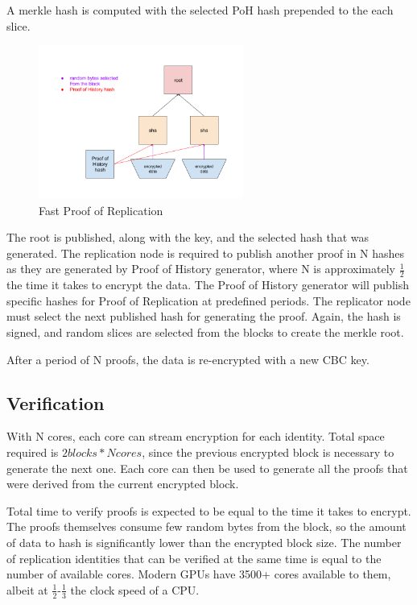 \documentclass[12pt]{article}
\begin{document}
A merkle hash is computed with the selected PoH hash prepended to the each slice.

\begin{figure}
  \begin{center}
    \centering
    \includegraphics[width=0.6\textwidth]{figures/fig_8.png}
    \caption[Fig 8]{Fast Proof of Replication\label{fig_8}}
  \end{center}
  \end{figure}

The root is published, along with the key, and the selected hash that was generated. The replication node is required to publish another proof in N hashes as they are generated by Proof of History generator, where N is approximately \(\frac{1}{2}\) the time it takes to encrypt the data. The Proof of History generator will publish specific hashes for Proof of Replication at predefined periods. The replicator node must select the next published hash for generating the proof. Again, the hash is signed, and random slices are selected from the blocks to create the merkle root.

After a period of N proofs, the data is re-encrypted with a new CBC key.
\subsection{Verification}

With N cores, each core can stream encryption for each identity. Total space required is \(2 blocks * N cores\), since the previous encrypted block is necessary to generate the next one. Each core can then be used to generate all the proofs that were derived from the current encrypted block.

Total time to verify proofs is expected to be equal to the time it takes to encrypt. The proofs themselves consume few random bytes from the block, so the amount of data to hash is significantly lower than the encrypted block size. The number of replication identities that can be verified at the same time is equal to the number of available cores. Modern GPUs have 3500+ cores available to them, albeit at \(\frac{1}{2}\)-\(\frac{1}{3}\) the clock speed of a CPU.
\end{document}
